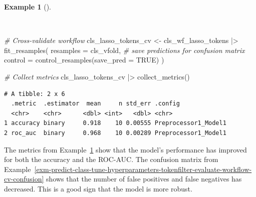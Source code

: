 \documentclass[
  letterpaper,
]{latex/krantz}
\newenvironment{Shaded}{\begin{snugshade}}{\end{snugshade}}
\newcommand{\AttributeTok}[1]{\textcolor[rgb]{0.00,0.00,0.00}{#1}}
\newcommand{\CommentTok}[1]{\textcolor[rgb]{0.00,0.00,0.00}{\textit{#1}}}
\newcommand{\ConstantTok}[1]{\textcolor[rgb]{0.00,0.00,0.00}{#1}}
\newcommand{\FunctionTok}[1]{\textcolor[rgb]{0.00,0.00,0.00}{#1}}
\newcommand{\NormalTok}[1]{\textcolor[rgb]{0.00,0.00,0.00}{#1}}
\newcommand{\OtherTok}[1]{\textcolor[rgb]{0.00,0.00,0.00}{#1}}
\newcommand{\SpecialCharTok}[1]{\textcolor[rgb]{0.00,0.00,0.00}{#1}}
\theoremstyle{definition}
\newtheorem{example}{Example}[chapter]
\theoremstyle{remark}
\begin{document}
\begin{example}[]\protect\hypertarget{exm-predict-class-tune-hyperparameters-tokenfilter-evaluate-workflow-cv-collect}{}\label{exm-predict-class-tune-hyperparameters-tokenfilter-evaluate-workflow-cv-collect}

~

\begin{Shaded}
\begin{Highlighting}[]
\CommentTok{\# Cross{-}validate workflow}
\NormalTok{cls\_lasso\_tokens\_cv }\OtherTok{\textless{}{-}}
\NormalTok{  cls\_wf\_lasso\_tokens }\SpecialCharTok{|\textgreater{}}
  \FunctionTok{fit\_resamples}\NormalTok{(}
    \AttributeTok{resamples =}\NormalTok{ cls\_vfold,}
    \CommentTok{\# save predictions for confusion matrix}
    \AttributeTok{control =} \FunctionTok{control\_resamples}\NormalTok{(}\AttributeTok{save\_pred =} \ConstantTok{TRUE}\NormalTok{)}
\NormalTok{  )}

\CommentTok{\# Collect metrics}
\NormalTok{cls\_lasso\_tokens\_cv }\SpecialCharTok{|\textgreater{}}
  \FunctionTok{collect\_metrics}\NormalTok{()}
\end{Highlighting}
\end{Shaded}

\begin{verbatim}
# A tibble: 2 x 6
  .metric  .estimator  mean     n std_err .config             
  <chr>    <chr>      <dbl> <int>   <dbl> <chr>               
1 accuracy binary     0.918    10 0.00555 Preprocessor1_Model1
2 roc_auc  binary     0.968    10 0.00289 Preprocessor1_Model1
\end{verbatim}

\end{example}

The metrics from
Example~\ref{exm-predict-class-tune-hyperparameters-tokenfilter-evaluate-workflow-cv-collect}
show that the model's performance has improved for both the accuracy and
the ROC-AUC. The confusion matrix from
Example~\ref{exm-predict-class-tune-hyperparameters-tokenfilter-evaluate-workflow-cv-confusion}
shows that the number of false positives and false negatives has
decreased. This is a good sign that the model is more robust.
\end{document}
